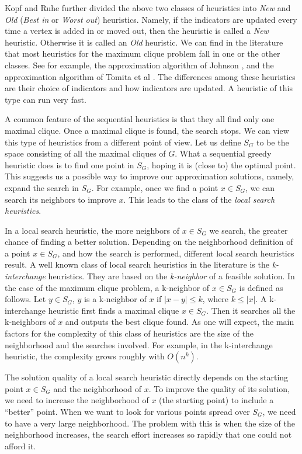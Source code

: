 Kopf and Ruhe \cite{KoRu87} further divided the above two classes of
heuristics into {\em New} and {\em Old} ({\em Best in} or {\em Worst
out}) heuristics. Namely, if the indicators are updated every time a
vertex is added in or moved out, then the heuristic is called a {\em
New} heuristic. Otherwise it is called an {\em Old} heuristic. We
can find in the literature that most heuristics for the maximum
clique problem fall in one or the other classes. See for example, the
approximation algorithm of Johnson \cite{Joh74}, and the
approximation algorithm of Tomita et al \cite{ToMiTa88}. The
differences among these heuristics are their choice of indicators
and how indicators are updated. A heuristic of this type can run
very fast.

A common feature of the sequential heuristics is that they all
find only one maximal clique. Once a maximal clique is found, the
search stops. We can view this type of heuristics from a different
point of view. Let us define $S_G$ to be the space consisting of all
the maximal cliques of $G$. What a sequential greedy heuristic does
is to find one point in $S_G$, hoping it is (close to) the optimal
point. This suggests us a possible way to improve our approximation
solutions, namely, expand the search in $S_G$. For example, once we
find a point $x \in S_G$, we can search its neighbors to improve
$x$. This leads to the class of the {\em local search heuristics}.

In a local search heuristic, the more neighbors of $x \in S_G$ we
search, the greater chance of finding a better solution. Depending
on the neighborhood definition of a point $x \in S_G$, and how the
search is performed, different local search heuristics result. A
well known class of local search heuristics in the literature is the
{\em k-interchange} heuristics. They are based on the {\em
k-neighbor} of a feasible solution. In the case of the maximum
clique problem, a k-neighbor of $x \in S_G$ is defined as follows.
Let $y \in S_G$, $y$ is a k-neighbor of $x$ if $|x-y| \leq k$, where
$k \leq |x|$. A k-interchange heuristic first finds a maximal clique
$x \in S_G$. Then it searches all the k-neighbors of $x$ and outputs
the best clique found. As one will expect, the main factors for the
complexity of this class of heuristics are the size of the
neighborhood and the searches involved. For example, in the
k-interchange heuristic, the complexity grows roughly with
$O(n^{k})$. 


The solution quality of a local search heuristic directly depends on
the starting point $x \in S_G$ and the neighborhood of $x$. To
improve the quality of its solution, we need to increase the
neighborhood of $x$ (the starting point) to include a ``better''
point. When we want to look for various points spread over $S_G$, we
need to have a very large neighborhood. The problem with this is
when the size of the neighborhood increases, the search effort
increases so rapidly that one could not afford it. 


